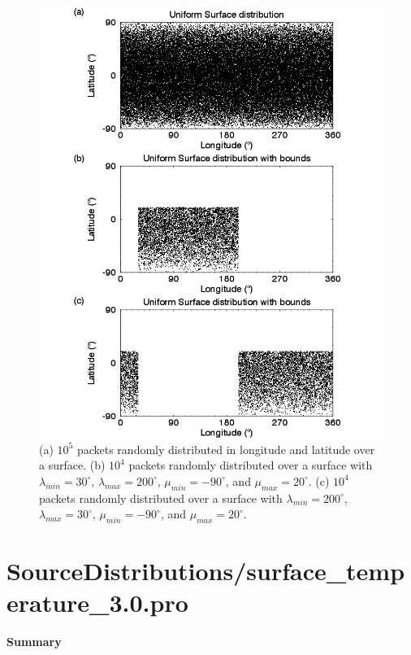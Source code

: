 \documentclass[11pt]{article}
\newcommand\descrip[1]{\textsf{\textbf{\large{#1}}}\\}
\begin{document}
\begin{figure}[h]
\includegraphics[width=\textwidth]{figures/surfdist0.png}
\caption{(a) $10^5$ packets randomly distributed in longitude and latitude over
a surface. 
(b) $10^4$ packets randomly distributed over a surface with
$\lambda_{min}=30^\circ$, $\lambda_{max}=200^{\circ}$, $\mu_{min}=-90^{\circ}$,
and $\mu_{max}=20^{\circ}$.
(c) $10^4$ packets randomly distributed over a surface with
$\lambda_{min}=200^\circ$, $\lambda_{max}=30^{\circ}$, $\mu_{min}=-90^{\circ}$,
and $\mu_{max}=20^{\circ}$.}
\label{fig:surfdist0}
\end{figure}

\clearpage

\section{SourceDistributions/surface\_temperature\_3.0.pro}
\label{sec:surface_temperature}

\descrip{Summary}
\end{document}
